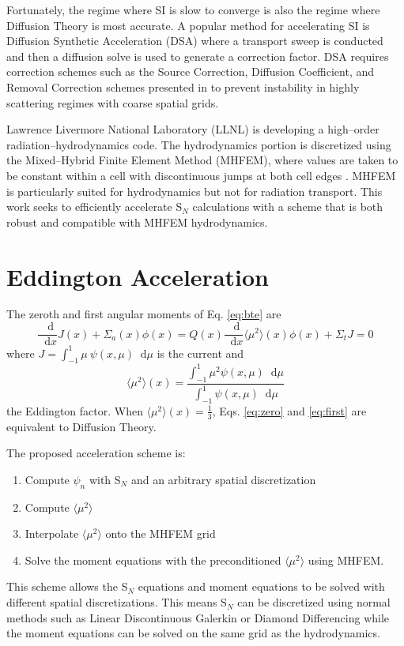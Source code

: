 \documentclass{anstrans}
\newcommand{\SN}{S$_N$\xspace}
\newcommand{\ud}{\mathop{}\!\mathrm{d}} %
\newcommand{\dderiv}[2]{\frac{\ud #1}{\ud #2}}
\newcommand{\edd}{\langle \mu^2 \rangle}
\begin{document}
	Fortunately, the regime where SI is slow to converge is also the regime where Diffusion Theory is most accurate. A popular method for accelerating SI is Diffusion Synthetic Acceleration (DSA) where a transport sweep is conducted and then a diffusion solve is used to generate a correction factor. DSA requires correction schemes such as the Source Correction, Diffusion Coefficient, and Removal Correction schemes presented in \cite{alcouffe} to prevent instability in highly scattering regimes with coarse spatial grids. 

	Lawrence Livermore National Laboratory (LLNL) is developing a high--order radiation--hydrodynamics code. The hydrodynamics portion is discretized using the Mixed--Hybrid Finite Element Method (MHFEM), where values are taken to be constant within a cell with discontinuous jumps at both cell edges \cite{mhfem}. MHFEM is particularly suited for hydrodynamics but not for radiation transport. This work seeks to efficiently accelerate \SN calculations with a scheme that is both robust and compatible with MHFEM hydrodynamics. 

\section{Eddington Acceleration}
	The zeroth and first angular moments of Eq. \ref{eq:bte} are 
		\begin{subequations} 
		\begin{equation} \label{eq:zero}
			\dderiv{}{x} J(x) + \Sigma_a(x) \phi(x) = Q(x) 
		\end{equation} 
		\begin{equation} \label{eq:first}
			\frac{\ud}{\ud x} \edd(x) \phi(x) + \Sigma_t J = 0  
		\end{equation}
		\end{subequations}
	where $J = \int_{-1}^{1} \mu \ \psi(x, \mu) \ud \mu$ is the current and 
		\begin{equation} \label{eq:eddington} 
			\edd(x) = \frac{\int_{-1}^1 \mu^2 \psi(x, \mu) \ud \mu}{\int_{-1}^1 \psi(x, \mu) \ud \mu}
		\end{equation}
	the Eddington factor. When $\edd(x) = \frac{1}{3}$, Eqs. \ref{eq:zero} and \ref{eq:first} are equivalent to Diffusion Theory. 

	The proposed acceleration scheme is: 
		\begin{enumerate}
			\item Compute $\psi_n$ with \SN and an arbitrary spatial discretization
			\item Compute $\edd$ 
			\item Interpolate $\edd$ onto the MHFEM grid 
			\item Solve the moment equations with the preconditioned $\edd$ using MHFEM. 
		\end{enumerate}
	This scheme allows the \SN equations and moment equations to be solved with different spatial discretizations. This means \SN can be discretized using normal methods such as Linear Discontinuous Galerkin or Diamond Differencing while the moment equations can be solved on the same grid as the hydrodynamics. 
\end{document}
